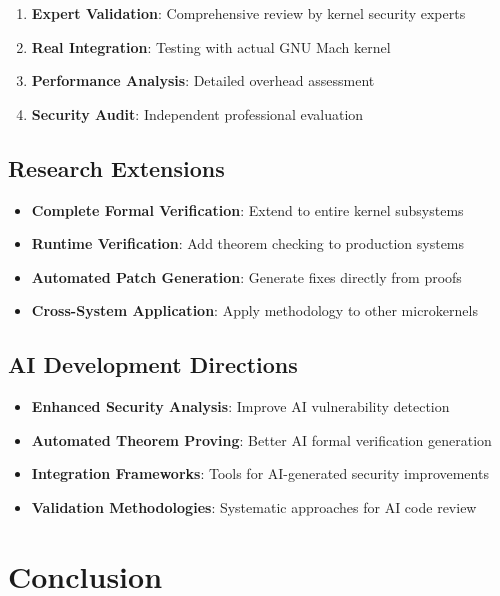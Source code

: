\documentclass[11pt,a4paper]{article}
\begin{document}
\begin{enumerate}
    \item \textbf{Expert Validation}: Comprehensive review by kernel security experts
    \item \textbf{Real Integration}: Testing with actual GNU Mach kernel
    \item \textbf{Performance Analysis}: Detailed overhead assessment
    \item \textbf{Security Audit}: Independent professional evaluation
\end{enumerate}

\subsection{Research Extensions}

\begin{itemize}
    \item \textbf{Complete Formal Verification}: Extend to entire kernel subsystems
    \item \textbf{Runtime Verification}: Add theorem checking to production systems
    \item \textbf{Automated Patch Generation}: Generate fixes directly from proofs
    \item \textbf{Cross-System Application}: Apply methodology to other microkernels
\end{itemize}

\subsection{AI Development Directions}

\begin{itemize}
    \item \textbf{Enhanced Security Analysis}: Improve AI vulnerability detection
    \item \textbf{Automated Theorem Proving}: Better AI formal verification generation
    \item \textbf{Integration Frameworks}: Tools for AI-generated security improvements
    \item \textbf{Validation Methodologies}: Systematic approaches for AI code review
\end{itemize}

\section{Conclusion}
\end{document}
